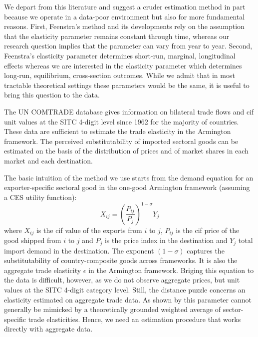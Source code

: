 \documentclass[12pt,twoside,a4paper,notitlepage]{article}
\begin{document}
We depart from this literature and suggest a cruder estimation method in part because we operate in a data-poor environment but also for more fundamental reasons.
First, Feenstra's method and its developments rely on the assumption that the elasticity parameter remains constant through time, whereas our research question implies that the parameter can vary from year to year.
Second, Feenstra's elasticity parameter determines short-run, marginal, longitudinal effects whereas we are interested in the elasticity parameter which determines long-run, equilibrium, cross-section outcomes.
While we admit that in most tractable theoretical settings these parameters would be the same, it is useful to bring this question to the data.

The UN COMTRADE database gives information on bilateral trade flows and cif unit values at the SITC 4-digit level since 1962 for the majority of countries.
These data are sufficient to estimate the trade elasticity in the Armington framework.
The perceived substitutability of imported sectoral goods can be estimated on the basis of the distribution of prices and of market shares in each market and each destination.

The basic intuition of the method we use starts from the demand equation for an exporter-specific sectoral good in the one-good Armington framework (assuming a CES utility function):
\[{{X}_{ij}}={{\left( \frac{{{P}_{ij}}}{{{P}_{j}}} \right)}^{1-\sigma}}{{Y}_{j}}\]
where ${X}_{ij}$ is the cif value of the exports from $i$ to $j$, ${{P}_{ij}}$ is the cif price of the good shipped from $i$ to $j$ and ${{P}_{j}}$ is the price index in the destination and ${{Y}_{j}}$ total import demand in the destination.
The exponent $\left( 1-\sigma \right)$ captures the substitutability of country-composite goods across frameworks.
It is also the aggregate trade elasticity $\epsilon $ in the Armington framework.
Briging this equation to the data is difficult, however, as we do not observe aggregate prices, but unit values at the SITC 4-digit category level.
Still, the distance puzzle concerns an elasticity estimated on aggregate trade data.
As shown by \cite{Imbs2015} this parameter cannot generally be mimicked by a theoretically grounded weighted average of sector-specific trade elasticities.
Hence, we need an estimation procedure that works directly with aggregate data.
\end{document}
